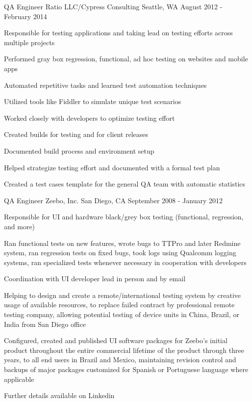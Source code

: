 \begin{cventries}
\cventry
{QA Engineer} %
{Ratio LLC/Cypress Consulting} %
{Seattle, WA} %
{August 2012 - February 2014} %
{
\begin{cvitems}
\item {Responsible for testing applications and taking lead on testing efforts across multiple projects}
\item {Performed gray box regression, functional, ad hoc testing on websites and mobile apps}
\item {Automated repetitive tasks and learned test automation techniques}
\item {Utilized tools like Fiddler to simulate unique test scenarios}
\item {Worked closely with developers to optimize testing effort}
\item {Created builds for testing and for client releases}
\item {Documented build process and environment setup}
\item {Helped strategize testing effort and documented with a formal test plan}
\item {Created a test cases template for the general QA team with automatic statistics}
\end{cvitems}
}

\cventry
{QA Engineer} %
{Zeebo, Inc.} %
{San Diego, CA} %
{September 2008 - January 2012} %
{
\begin{cvitems}
\item {Responsible for UI and hardware black/grey box testing (functional, regression, and more)}
\item {Ran functional tests on new features, wrote bugs to TTPro and later Redmine system, ran regression tests on fixed bugs, took logs using Qualcomm logging systems, ran specialized tests whenever necessary in cooperation with developers}
\item {Coordination with UI developer lead in person and by email}
\item {Helping to design and create a remote/international testing system by creative usage of available resources, to replace failed contract by professional remote testing company, allowing potential testing of device units in China, Brazil, or India from San Diego office}
\item {Configured, created and published UI software packages for Zeebo's initial product throughout the entire commercial lifetime of the product through three years, to all end users in Brazil and Mexico, maintaining revision control and backups of major packages customized for Spanish or Portuguese language where applicable}
\end{cvitems}
}

\cventry
{} %
{Further details available on Linkedin} %
{} %
{} %
{}

\end{cventries}
